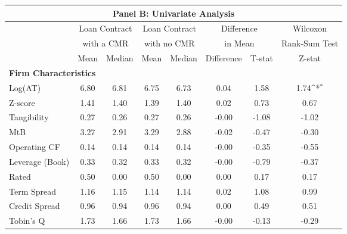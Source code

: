{
\def\sym#1{\ifmmode^{#1}\else\(^{#1}\)\fi}
\begin{tabular}{l*{1}{ccccccc}}
\toprule
                     \multicolumn{8}{c}{\small \centering \textbf{Panel B}: Univariate Analysis} \\ \midrule                     & \multicolumn{2}{c}{Loan Contract} & \multicolumn{2}{c}{Loan Contract} & \multicolumn{2}{c}{Difference} & Wilcoxon \\                     & \multicolumn{2}{c}{with a CMR} &  \multicolumn{2}{c}{with no CMR} &  \multicolumn{2}{c}{in Mean} &  \multicolumn{1}{c}{Rank-Sum Test} \\                         \cmidrule(lr){2-3}\cmidrule(lr){4-5}\cmidrule(lr){6-7}\cmidrule(lr){8-8}                    &        Mean&      Median&        Mean&      Median&  Difference         &      T-stat&      Z-stat         \\
\midrule
\multicolumn{8}{l}{\textbf{Firm Characteristics}} \\ Log(AT)             &        6.80&        6.81&        6.75&        6.73&        0.04         &        1.58&        1.74\sym{*}  \\
Z-score             &        1.41&        1.40&        1.39&        1.40&        0.02         &        0.73&        0.67         \\
Tangibility         &        0.27&        0.26&        0.27&        0.26&       -0.00         &       -1.08&       -1.02         \\
MtB                 &        3.27&        2.91&        3.29&        2.88&       -0.02         &       -0.47&       -0.30         \\
Operating CF        &        0.14&        0.14&        0.14&        0.14&       -0.00         &       -0.35&       -0.55         \\
Leverage (Book)     &        0.33&        0.32&        0.33&        0.32&       -0.00         &       -0.79&       -0.37         \\
Rated               &        0.50&        0.00&        0.50&        0.00&        0.00         &        0.17&        0.17         \\
Term Spread         &        1.16&        1.15&        1.14&        1.14&        0.02         &        1.08&        0.99         \\
Credit Spread       &        0.96&        0.94&        0.96&        0.94&        0.00         &        0.49&        0.51         \\
Tobin's Q           &        1.73&        1.66&        1.73&        1.66&       -0.00         &       -0.13&       -0.29         \\

\end{tabular}}
